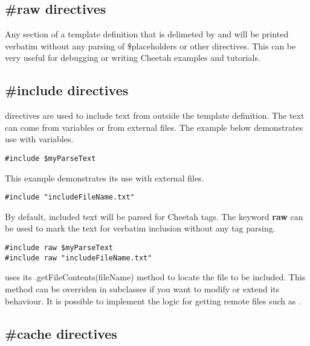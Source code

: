 \subsection{\#raw directives}
Any section of a template definition that is delimeted by  and
 will be printed verbatim without any parsing of
\$placeholders or other directives.  This can be very useful for debugging or
writing Cheetah examples and tutorials.

\subsection{\#include directives}

 directives are used to include text from outside the template
definition.  The text can come from  variables or from
external files.  The example below demonstrates use with 
variables.

\begin{verbatim}
#include $myParseText
\end{verbatim}

This example demonstrates its use with external files.
\begin{verbatim}
#include "includeFileName.txt"
\end{verbatim}

By default, included text will be parsed for Cheetah tags.  The keyword
{\bf raw} can be used to mark the text for verbatim inclusion without any tag
parsing.

\begin{verbatim}
#include raw $myParseText
#include raw "includeFileName.txt"
\end{verbatim}

 uses its .getFileContents(fileName) method to locate the file to
be included.  This method can be overriden in subclasses if you want to modify
or extend its behaviour.  It is possible to implement the logic for getting 
remote files such as .


\subsection{\#cache directives}


